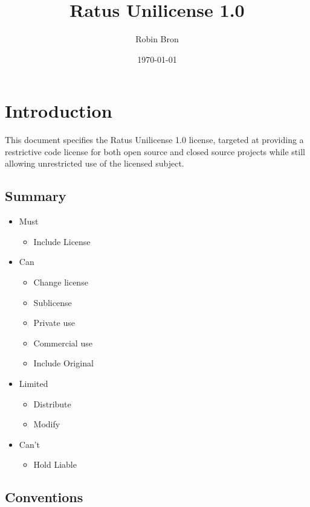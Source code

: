 \documentclass[a4paper,11pt]{article}
\begin{document}
\title{Ratus Unilicense 1.0}
\author{Robin Bron}
\date{\today}
\maketitle

\vfill


\newpage
\tableofcontents
\newpage

\section{Introduction}
  This document specifies the Ratus Unilicense 1.0 license, targeted at
  providing a restrictive code license for both open source and closed source
  projects while still allowing unrestricted use of the licensed subject.

\subsection{Summary}
  \begin{itemize}
    \item Must
    \begin{itemize}
      \item Include License
    \end{itemize}
    \item Can
    \begin{itemize}
      \item Change license
      \item Sublicense
      \item Private use
      \item Commercial use
      \item Include Original
    \end{itemize}
    \item Limited
    \begin{itemize}
      \item Distribute
      \item Modify
    \end{itemize}
    \item Can't
    \begin{itemize}
      \item Hold Liable
    \end{itemize}
  \end{itemize}

\subsection{Conventions}

\end{document}
